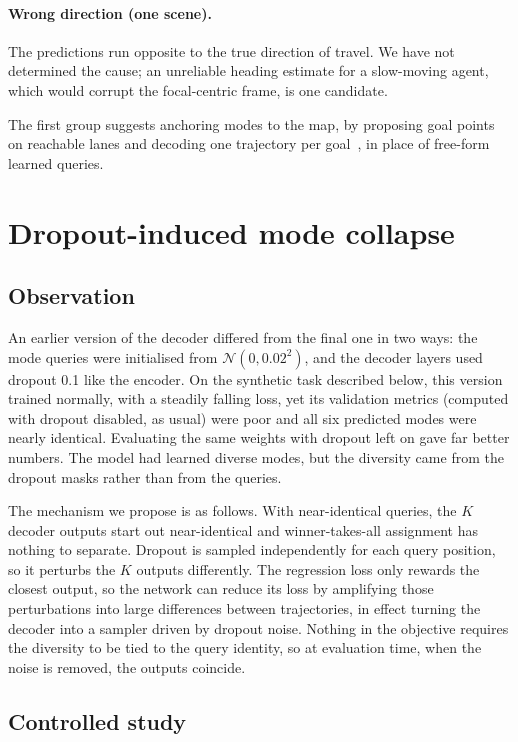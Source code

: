 \documentclass[10pt]{article}
\begin{document}
\paragraph{Wrong direction (one scene).} The predictions run opposite to the true direction
of travel. We have not determined the cause; an unreliable heading estimate for a slow-moving
agent, which would corrupt the focal-centric frame, is one candidate.

The first group suggests anchoring modes to the map, by proposing goal points on reachable
lanes and decoding one trajectory per goal~\cite{zhao2020tnt,gu2021densetnt}, in place of
free-form learned queries.

\section{Dropout-induced mode collapse}
\label{sec:collapse}

\subsection{Observation}

An earlier version of the decoder differed from the final one in two ways: the mode queries
were initialised from $\mathcal{N}(0, 0.02^2)$, and the decoder layers used dropout 0.1 like
the encoder. On the synthetic task described below, this version trained normally, with a
steadily falling loss, yet its validation metrics (computed with dropout disabled, as usual)
were poor and all six predicted modes were nearly identical. Evaluating the same weights with
dropout left on gave far better numbers. The model had learned diverse modes, but the
diversity came from the dropout masks rather than from the queries.

The mechanism we propose is as follows. With near-identical queries, the $K$ decoder outputs
start out near-identical and winner-takes-all assignment has nothing to separate. Dropout is
sampled independently for each query position, so it perturbs the $K$ outputs differently.
The regression loss only rewards the closest output, so the network can reduce its loss by
amplifying those perturbations into large differences between trajectories, in effect turning
the decoder into a sampler driven by dropout noise. Nothing in the objective requires the
diversity to be tied to the query identity, so at evaluation time, when the noise is removed,
the outputs coincide.

\subsection{Controlled study}
\end{document}
